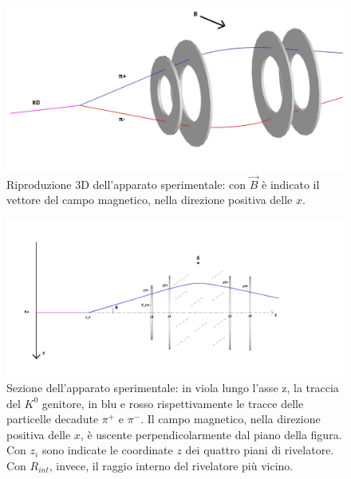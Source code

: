 \documentclass[8pt]{extarticle}
\begin{document}
\begin{figure}
	\begin{center}
		\includegraphics[scale=0.4]{apparato_3d} 
		\caption{Riproduzione 3D dell'apparato sperimentale: con $\vec{B}$ è indicato il vettore del campo magnetico, nella direzione positiva delle $x$.}
		\label{fig:apparato_3d}
	\end{center}
\end{figure}

\begin{figure}
	\begin{center}
		\includegraphics[scale=0.4]{apparato_2d}
		\caption{Sezione dell'apparato sperimentale: in viola lungo l'asse z, la traccia del $K^0$ genitore, in blu e rosso rispettivamente le tracce delle particelle decadute $\pi^+$ e $\pi^-$. Il campo magnetico, nella direzione positiva delle $x$, è uscente perpendicolarmente dal piano della figura. Con $z_i$ sono indicate le coordinate $z$ dei quattro piani di rivelatore. Con $R_{int}$, invece, il raggio interno del rivelatore più vicino.}
		\label{fig:apparato_2d}
	\end{center}
\end{figure}
\end{document}
